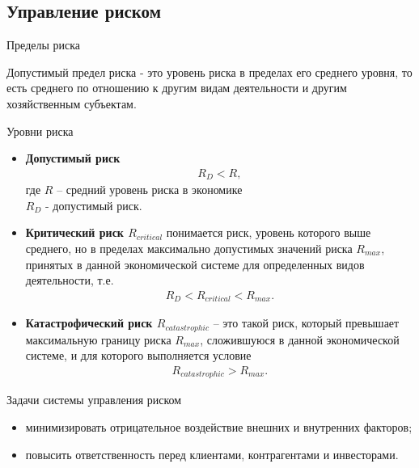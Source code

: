 \documentclass[financial_risks_lectures.tex]{subfiles}
\begin{document}
\subsection{Управление риском}
\begin{frame}{Пределы риска}
\begin{block}{Допустимый предел риска}
- это уровень риска в пределах его среднего уровня, то есть среднего по отношению к другим видам деятельности и другим хозяйственным субъектам. 
\end{block}
\end{frame}

\begin{frame}[shrink=15]{Уровни риска}
\begin{itemize}
\item
\textbf{Допустимый риск}
\begin{align}
R_D<R,
\end{align}
где $R$ – средний уровень риска в экономике\\
$R_D$ - допустимый риск.
\item
\textbf{Критический риск $R_{critical}$ }понимается риск, уровень которого выше среднего, но в пределах максимально допустимых значений риска $R_{max}$, принятых в данной экономической системе для определенных видов деятельности, т.е.
\begin{align}
R_D<R_{critical}<R_{max}.
\end{align}
\item
\textbf{Катастрофический риск $R_{catastrophic}$} – это такой риск, который превышает максимальную границу риска $R_{max}$, сложившуюся в данной экономической системе, и для которого выполняется условие
\begin{align}
R_{catastrophic}>R_{max}.
\end{align} 
\end{itemize}
\end{frame}

\begin{frame}{Задачи системы управления риском}
\begin{itemize}[<+->]
 максимальную сохранность собственных средств; 
\item
минимизировать отрицательное воздействие внешних и внутренних факторов;
\item
повысить ответственность перед клиентами, контрагентами и инвесторами.
\end{itemize}
\end{frame}
\end{document}
